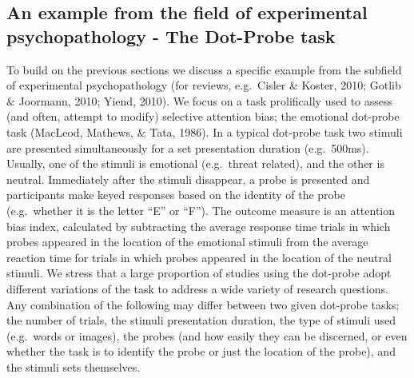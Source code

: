 \documentclass[english,,man,floatsintext]{apa6}
\begin{document}
\hypertarget{an-example-from-the-field-of-experimental-psychopathology---the-dot-probe-task}{%
\subsection{An example from the field of experimental psychopathology - The Dot-Probe task}\label{an-example-from-the-field-of-experimental-psychopathology---the-dot-probe-task}}

To build on the previous sections we discuss a specific example from the subfield of experimental psychopathology (for reviews, e.g.~Cisler \& Koster, 2010; Gotlib \& Joormann, 2010; Yiend, 2010). We focus on a task prolifically used to assess (and often, attempt to modify) selective attention bias; the emotional dot-probe task (MacLeod, Mathews, \& Tata, 1986). In a typical dot-probe task two stimuli are presented simultaneously for a set presentation duration (e.g.~500ms). Usually, one of the stimuli is emotional (e.g.~threat related), and the other is neutral. Immediately after the stimuli disappear, a probe is presented and participants make keyed responses based on the identity of the probe (e.g.~whether it is the letter \enquote{E} or \enquote{F}). The outcome measure is an attention bias index, calculated by subtracting the average response time trials in which probes appeared in the location of the emotional stimuli from the average reaction time for trials in which probes appeared in the location of the neutral stimuli. We stress that a large proportion of studies using the dot-probe adopt different variations of the task to address a wide variety of research questions. Any combination of the following may differ between two given dot-probe tasks; the number of trials, the stimuli presentation duration, the type of stimuli used (e.g.~words or images), the probes (and how easily they can be discerned, or even whether the task is to identify the probe or just the location of the probe), and the stimuli sets themselves.
\end{document}
